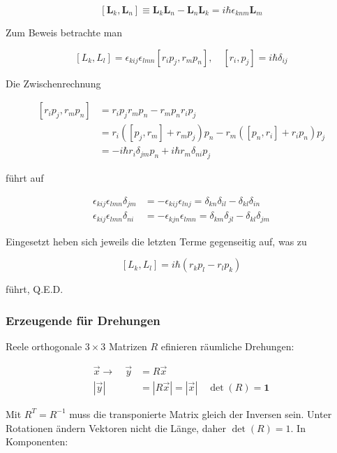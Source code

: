 \documentclass[10pt, letterpaper]{article}
\begin{document}
$$
\left[\mathbf{L}_{k}, \mathbf{L}_{n}\right] \equiv \mathbf{L}_{k} \mathbf{L}_{n}-\mathbf{L}_{n} \mathbf{L}_{k}=i \hbar \epsilon_{k n m} \mathbf{L}_{m}
$$

Zum Beweis betrachte man

$$
\left[L_{k}, L_{l}\right]=\epsilon_{k i j} \epsilon_{l m n}\left[r_{i} p_{j}, r_{m} p_{n}\right], \quad\left[r_{i}, p_{j}\right]=i \hbar \delta_{i j}
$$

Die Zwischenrechnung

$$
\begin{aligned}
{\left[r_{i} p_{j}, r_{m} p_{n}\right] } & =r_{i} p_{j} r_{m} p_{n}-r_{m} p_{n} r_{i} p_{j} \\
& =r_{i}\left(\left[p_{j}, r_{m}\right]+r_{m} p_{j}\right) p_{n}-r_{m}\left(\left[p_{n}, r_{i}\right]+r_{i} p_{n}\right) p_{j} \\
& =-i \hbar r_{i} \delta_{j m} p_{n}+i \hbar r_{m} \delta_{n i} p_{j}
\end{aligned}
$$

führt auf

$$
\begin{aligned}
\epsilon_{k i j} \epsilon_{l m n} \delta_{j m} & =-\epsilon_{k i j} \epsilon_{l n j}=\delta_{k n} \delta_{i l}-\delta_{k l} \delta_{i n} \\
\epsilon_{k i j} \epsilon_{l m n} \delta_{n i} & =-\epsilon_{k j n} \epsilon_{l m n}=\delta_{k m} \delta_{j l}-\delta_{k l} \delta_{j m}
\end{aligned}
$$

Eingesetzt heben sich jeweils die letzten Terme gegenseitig auf, was zu

$$
\left[L_{k}, L_{l}\right]=i \hbar\left(r_{k} p_{l}-r_{l} p_{k}\right)
$$

führt, Q.E.D.

\subsubsection*{Erzeugende für Drehungen}
Reele orthogonale $3 \times 3$ Matrizen $R$ efinieren räumliche Drehungen:

$$
\begin{aligned}
\vec{x} \rightarrow \quad \vec{y} & =R \vec{x} \\
|\vec{y}| & =|R \vec{x}|=|\vec{x}| \quad \operatorname{det}(R)=\mathbf{1}
\end{aligned}
$$

Mit $R^{T}=R^{-1}$ muss die transponierte Matrix gleich der Inversen sein. Unter Rotationen ändern Vektoren nicht die Länge, daher $\operatorname{det}(R)=1$. In Komponenten:
\end{document}
